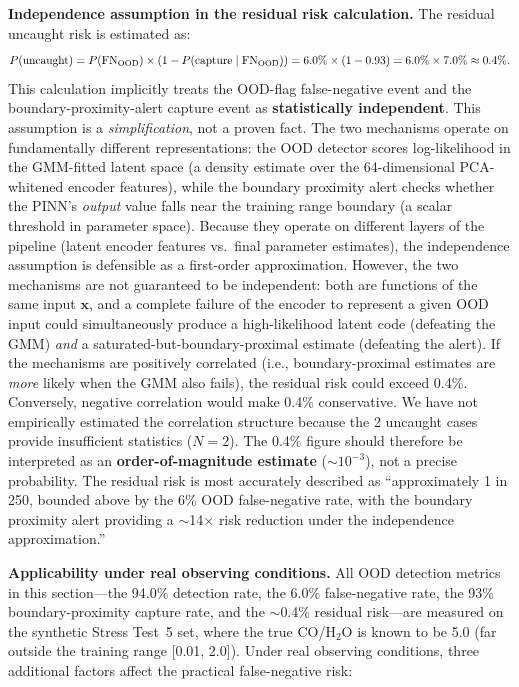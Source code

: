 \documentclass[usenatbib]{mnras}
\begin{document}
\textbf{Independence assumption in the residual risk calculation.} The residual uncaught risk is estimated as:
\begin{equation}\label{eq:residual_risk}
P(\text{uncaught}) = P(\text{FN}_{\rm OOD}) \times (1 - P(\text{capture} \mid \text{FN}_{\rm OOD})) = 6.0\% \times (1 - 0.93) = 6.0\% \times 7.0\% \approx 0.4\%.
\end{equation}
This calculation implicitly treats the OOD-flag false-negative event and the boundary-proximity-alert capture event as \textbf{statistically independent}. This assumption is a \textit{simplification}, not a proven fact. The two mechanisms operate on fundamentally different representations: the OOD detector scores log-likelihood in the GMM-fitted latent space (a density estimate over the 64-dimensional PCA-whitened encoder features), while the boundary proximity alert checks whether the PINN's \textit{output} value falls near the training range boundary (a scalar threshold in parameter space). Because they operate on different layers of the pipeline (latent encoder features vs.\ final parameter estimates), the independence assumption is defensible as a first-order approximation. However, the two mechanisms are not guaranteed to be independent: both are functions of the same input $\mathbf{x}$, and a complete failure of the encoder to represent a given OOD input could simultaneously produce a high-likelihood latent code (defeating the GMM) \textit{and} a saturated-but-boundary-proximal estimate (defeating the alert). If the mechanisms are positively correlated (i.e., boundary-proximal estimates are \textit{more} likely when the GMM also fails), the residual risk could exceed 0.4\%. Conversely, negative correlation would make 0.4\% conservative. We have not empirically estimated the correlation structure because the 2 uncaught cases provide insufficient statistics ($N=2$). The 0.4\% figure should therefore be interpreted as an \textbf{order-of-magnitude estimate} ($\sim 10^{-3}$), not a precise probability. The residual risk is most accurately described as ``approximately 1 in 250, bounded above by the 6\% OOD false-negative rate, with the boundary proximity alert providing a $\sim$14$\times$ risk reduction under the independence approximation.''

\textbf{Applicability under real observing conditions.} All OOD detection metrics in this section---the 94.0\% detection rate, the 6.0\% false-negative rate, the 93\% boundary-proximity capture rate, and the $\sim$0.4\% residual risk---are measured on the synthetic Stress Test~5 set, where the true CO/H$_2$O is known to be 5.0 (far outside the training range [0.01, 2.0]). Under real observing conditions, three additional factors affect the practical false-negative risk:
\end{document}

